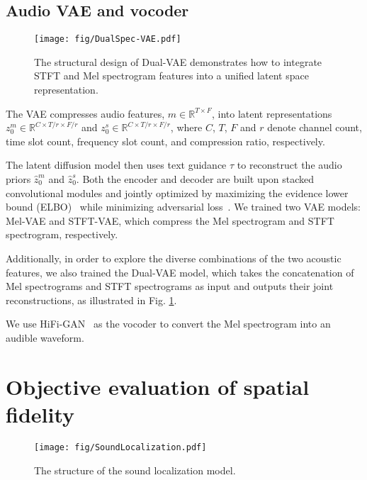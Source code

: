 \documentclass{IEEEtran}
\begin{document}
\vspace{-0.5em}


\subsection{Audio VAE and vocoder}
\label{sec:DualSpec_vae_arch}
\begin{figure}[t]
    \centering
    \texttt{[image: fig/DualSpec-VAE.pdf]}
    \caption{The structural design of Dual-VAE demonstrates how to integrate STFT and Mel spectrogram features into a unified latent space representation.}
    \label{fig:DualSpec_vae}
\end{figure}



The VAE compresses audio features, \( m \in \mathbb{R}^{T \times F} \), into latent representations \( z^{m}_{0} \in \mathbb{R}^{C \times T/r \times F/r} \) and \( z^{s}_{0} \in \mathbb{R}^{C \times T/r \times F/r} \), where \( C \), \( T \), \( F \) and \( r \) denote channel count, time slot count, frequency slot count, and compression ratio, respectively.

The latent diffusion model then uses text guidance \( \tau \) to reconstruct the audio priors \( \hat{z}^{m}_{0} \) and \( \hat{z}^{s}_{0} \). Both the encoder and decoder are built upon stacked convolutional modules \cite{liu2023audioldm} and jointly optimized by maximizing the evidence lower bound (ELBO)~\cite{kingma2013auto} while minimizing adversarial loss~\cite{isola2017image}. We trained two VAE models: Mel-VAE and STFT-VAE, which compress the Mel spectrogram and STFT spectrogram, respectively.

Additionally, in order to explore the diverse combinations of the two acoustic features, we also trained the Dual-VAE model, which takes the concatenation of Mel spectrograms and STFT spectrograms as input and outputs their joint reconstructions, as illustrated in Fig. \ref{fig:DualSpec_vae}.

We use HiFi-GAN~\cite{kong2020hifi} as the vocoder to convert the Mel spectrogram into an audible waveform.


\section{Objective evaluation of spatial fidelity}

\label{sec:local}
\begin{figure}[t]
    \centering
    \texttt{[image: fig/SoundLocalization.pdf]}
    \caption{The structure of the sound localization model.}
    \label{fig:local}
\end{figure}
\end{document}
